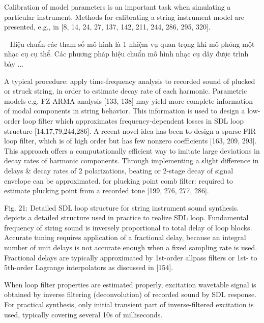 \documentclass{article}
\begin{document}
\begin{itemize}
\begin{itemize}
		Calibration of model parameters is an important task when simulating a particular instrument. Methods for calibrating a string instrument model are presented, e.g., in [8, 14, 24, 27, 137, 142, 211, 244, 286, 295, 320].
		
		-- Hiệu chuẩn các tham số mô hình là 1 nhiệm vụ quan trọng khi mô phỏng một nhạc cụ cụ thể. Các phương pháp hiệu chuẩn mô hình nhạc cụ dây được trình bày $\ldots$
		
		A typical procedure: apply time-frequency analysis to recorded sound of plucked or struck string, in order to estimate decay rate of each harmonic. Parametric models e.g. FZ-ARMA analysis [133, 138] may yield more complete information of modal components in string behavior. This information is used to design a low-order loop filter which approximates frequency-dependent losses in SDL loop structure [14,17,79,244,286]. A recent novel idea has been to design a sparse FIR loop filter, which is of high order but has few nonzero coefficients [163, 209, 293]. This approach offers a computationally efficient way to imitate large deviations in decay rates of harmonic components. Through implementing a slight difference in delays \& decay rates of 2 polarizations, beating or 2-stage decay of signal envelope can be approximated. for plucking point comb filter: required to estimate plucking point from a recorded tone [199, 276, 277, 286].
		
		{\sf Fig. 21: Detailed SDL loop structure for string instrument sound synthesis.} depicts a detailed structure used in practice to realize SDL loop. Fundamental frequency of string sound is inversely proportional to total delay of loop blocks. Accurate tuning requires application of a fractional delay, because an integral number of unit delays is not accurate enough when a fixed sampling rate is used. Fractional delays are typically approximated by 1st-order allpass filters or 1st- to 5th-order Lagrange interpolators as discussed in [154].
		
		When loop filter properties are estimated properly, excitation wavetable signal is obtained by inverse filtering (deconvolution) of recorded sound by SDL response. For practical synthesis, only initial transient part of inverse-filtered excitation is used, typically covering several 10s of milliseconds.
		

\end{itemize}
\end{itemize}
\end{document}
